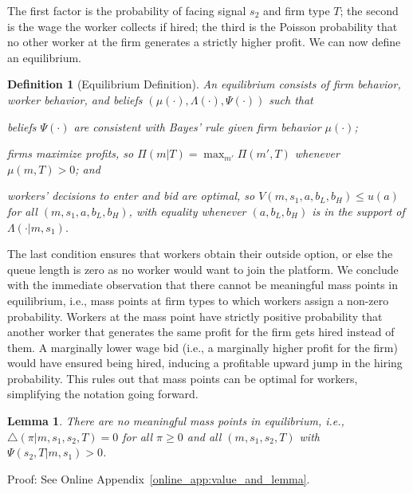 \documentclass[12pt]{article}
\newtheorem*{definition*}{Definition}
\newtheorem*{lemma*}{Lemma}
\begin{document}
The first factor is the probability of facing signal $s_{2}$ and firm type $T$;
the second is the wage the worker collects if hired; the third is the Poisson
probability that no other worker at the firm generates a strictly higher profit.
We can now define an equilibrium.

\begin{definition*}[Equilibrium Definition]
An equilibrium consists of firm behavior, worker behavior, and beliefs
$(\mu(\cdot),\Lambda(\cdot),\Psi(\cdot))$ such that
\begin{enumerate}[label={[\arabic*]}]
\item beliefs $\Psi(\cdot)$ are consistent with Bayes' rule given firm
behavior $\mu(\cdot)$;
\item firms maximize profits, so $\Pi(m|T)=\max_{m'}\Pi(m',T)$ whenever
$\mu(m,T)>0$; and
\item workers' decisions to enter and bid are optimal, so
$V(m,s_{1},a,b_{L},b_{H})\leq u(a)$ for all $(m,s_{1},a,b_{L},b_{H})$, with
equality whenever $(a,b_{L},b_{H})$ is in the support of
$\Lambda(\cdot|m,s_{1})$.
\end{enumerate}
\end{definition*}

The last condition ensures that workers obtain their outside option, or else the queue length is zero as no worker would want to join the platform. 
We conclude with the immediate observation that there cannot be meaningful
mass points in equilibrium, i.e., mass points at firm types to which workers assign a non-zero probability. 
Workers at the mass point have strictly positive probability that another worker that generates the same profit for the firm gets hired instead of them. 
A marginally lower wage bid (i.e., a marginally higher profit for the firm) would have ensured being hired, inducing a profitable upward jump in the hiring probability. This rules out that mass points can be optimal for workers, simplifying the notation going forward.

\begin{lemma*}
\label{no-mass-point-lemma}
There are no meaningful mass points in equilibrium, i.e.,
$\bigtriangleup(\pi|m,s_1,s_2,T)=0$ for all $\pi\geq 0$ and all
$(m,s_1,s_2,T)$ with $\Psi(s_2,T|m,s_1)>0$.
\end{lemma*}

\noindent Proof: See Online Appendix~\ref{online_app:value_and_lemma}.
\end{document}
